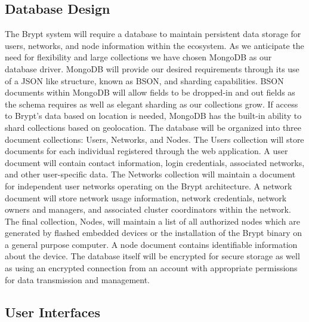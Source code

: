 \documentclass[tikz,a4paper,titlepage]{article}
\begin{document}
\subsection{Database Design}

The Brypt system will require a database to maintain persistent data storage for users, networks, and node information within the ecosystem. As we anticipate the need for flexibility and large collections we have chosen MongoDB as our database driver. MongoDB will provide our desired requirements through its use of a JSON like structure, known as BSON, and sharding capabilities. BSON documents within MongoDB will allow fields to be dropped-in and out fields as the schema requires as well as elegant sharding as our collections grow. If access to Brypt’s data based on location is needed, MongoDB has the built-in ability to shard collections based on geolocation. The database will be organized into three document collections: Users, Networks, and Nodes. The Users collection will store documents for each individual registered through the web application. A user document will contain contact information, login credentials, associated networks, and other user-specific data. The Networks collection will maintain a document for independent user networks operating on the Brypt architecture. A network document will store network usage information, network credentials, network owners and managers, and associated cluster coordinators within the network. The final collection, Nodes, will maintain a list of all authorized nodes which are generated by flashed embedded devices or the installation of the Brypt binary on a general purpose computer. A node document contains identifiable information about the device. The database itself will be encrypted for secure storage as well as using an encrypted connection from an account with appropriate permissions for data transmission and management.



\subsection{User Interfaces}
\end{document}
